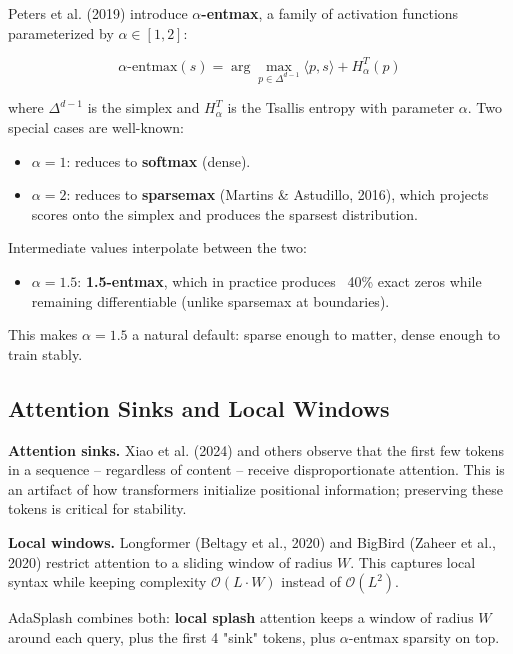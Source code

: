 Peters et al. (2019) introduce \textbf{$\alpha$-entmax}, a family of activation functions 
parameterized by $\alpha \in [1, 2]$:

\[
\text{$\alpha$-entmax}(s) = \arg\max_{p \in \Delta^{d-1}} \langle p, s \rangle + H_\alpha^T(p)
\tag{1.2}
\]

where $\Delta^{d-1}$ is the simplex and $H_\alpha^T$ is the Tsallis entropy 
with parameter $\alpha$. Two special cases are well-known:

\begin{itemize}
\item $\alpha = 1$: reduces to \textbf{softmax} (dense).
\item $\alpha = 2$: reduces to \textbf{sparsemax} (Martins \& Astudillo, 2016),
  which projects scores onto the simplex and produces the sparsest
  distribution.

\end{itemize}
Intermediate values interpolate between the two:

\begin{itemize}
\item $\alpha = 1.5$: \textbf{1.5-entmax}, which in practice produces ~40\% exact zeros
  while remaining differentiable (unlike sparsemax at boundaries).

\end{itemize}
This makes $\alpha = 1.5$ a natural default: sparse enough to matter, dense 
enough to train stably.

\subsection{Attention Sinks and Local Windows}

\textbf{Attention sinks.} Xiao et al. (2024) and others observe that the first 
few tokens in a sequence -- regardless of content -- receive disproportionate 
attention. This is an artifact of how transformers initialize positional 
information; preserving these tokens is critical for stability.

\textbf{Local windows.} Longformer (Beltagy et al., 2020) and BigBird (Zaheer et al., 
2020) restrict attention to a sliding window of radius $W$. This captures 
local syntax while keeping complexity $\mathcal{O}(L \cdot W)$ instead of 
$\mathcal{O}(L^2)$.

AdaSplash combines both: \textbf{local splash} attention keeps a window of radius 
$W$ around each query, plus the first 4 "sink" tokens, plus $\alpha$-entmax 
sparsity on top.

